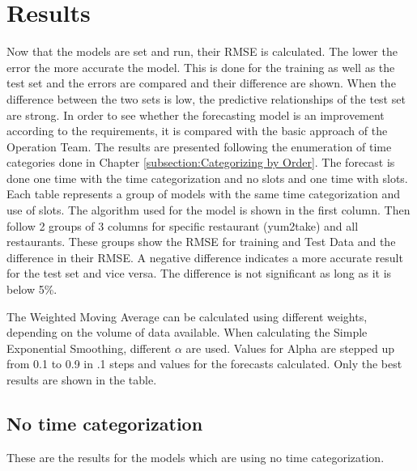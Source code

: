 \chapter{Results}\label{chapter:Results}
Now that the models are set and run, their RMSE is calculated. The lower the error the more accurate the model. This is done for the training as well as the test set and the errors are compared and their difference are shown. When the difference between the two sets is low, the predictive relationships of the test set are strong.\newline
In order to see whether the forecasting model is an improvement according to the requirements, it is compared with the basic approach of the Operation Team.\newline
The results are presented following the enumeration of time categories done in Chapter \ref{subsection:Categorizing by Order}. The forecast is done one time with the time categorization and no slots and one time with slots.\newline
Each table represents a group of models with the same time categorization and use of slots. The algorithm used for the model is shown in the first column. Then follow 2 groups of 3 columns for specific restaurant (yum2take) and all restaurants. These groups show the RMSE for training and Test Data and the difference in their RMSE. A negative difference indicates a more accurate result for the test set and vice versa. The difference is not significant as long as it is below 5\%.\newline

The Weighted Moving Average can be calculated using different weights, depending on the volume of data available. When calculating the Simple Exponential Smoothing, different $\alpha$ are used. Values for Alpha are stepped up from 0.1 to 0.9 in .1 steps and values for the forecasts calculated. Only the best results are shown in the table.
\section{No time categorization}\label{section:No time categorization}
These are the results for the models which are using no time categorization.
